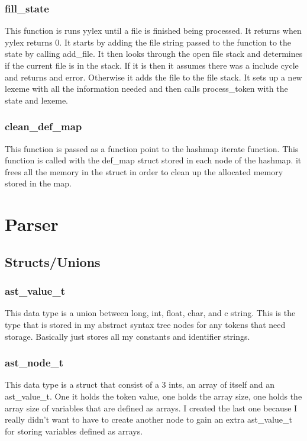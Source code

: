 \documentclass[11pt]{article}
\begin{document}
            \subsubsection{fill\_state}
                This function is runs yylex until a file is finished being processed. It returns when yylex returns 0. 
                It starts by adding the file string passed to the function to the state by calling add\_file.
                It then looks through the open file stack and determines if the current file is in the stack.
                If it is then it assumes there was a include cycle and returns and error. Otherwise it adds the file
                to the file stack.
                It sets up a new lexeme with all the information needed and then calls process\_token with the state and lexeme.

            \subsubsection{clean\_def\_map}
                This function is passed as a function point to the hashmap iterate function.
                This function is called with the def\_map struct stored in each node of the hashmap.
                it frees all the memory in the struct in order to clean up the allocated memory stored in the map.
    
    \section{Parser}
        
        \subsection{Structs/Unions}

            \subsubsection{ast\_value\_t}
                This data type is a union between long, int, float, char, and c string. This is the type that is stored in my abstract syntax tree 
                nodes for any tokens that need storage. Basically just stores all my constants and identifier strings.

            \subsubsection{ast\_node\_t}
                This data type is a struct that consist of a 3 ints, an array of itself and an ast\_value\_t. One it holds the token value, one holds the array size, 
                one holds the array size of variables that are defined as arrays. I created the last one because I really didn't want to have to create another node 
                to gain an extra ast\_value\_t for storing variables defined as arrays.
\end{document}
